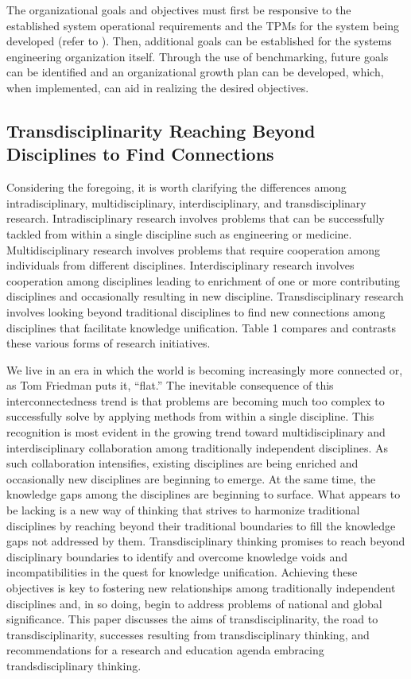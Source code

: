 The organizational goals and objectives must first be responsive to the established system operational requirements and the TPMs for the system being developed (refer to ). Then, additional goals can be established for the systems engineering organization itself. Through the use of benchmarking, future goals can be identified and an organizational growth plan can be developed, which, when implemented, can aid in realizing the desired objectives.

\subsection{Transdisciplinarity Reaching Beyond Disciplines to Find Connections}

Considering the foregoing, it is worth clarifying the differences among intradisciplinary, multidisciplinary, interdisciplinary, and transdisciplinary research. Intradisciplinary research involves problems that can be successfully tackled from within a single discipline such as engineering or medicine. Multidisciplinary research involves problems that require cooperation among individuals from different disciplines. Interdisciplinary research involves cooperation among disciplines leading to enrichment of one or more contributing disciplines and occasionally resulting in new discipline. Transdisciplinary research involves looking beyond traditional disciplines to find new connections among disciplines that facilitate knowledge unification. Table 1 compares and contrasts these various forms of research initiatives. 

We live in an era in which the world is becoming increasingly more connected or, as Tom Friedman puts it, ``flat.'' The inevitable consequence of this interconnectedness trend is that problems are becoming much too complex to successfully solve by applying methods from within a single discipline. This recognition is most evident in the growing trend toward multidisciplinary and interdisciplinary collaboration among traditionally independent disciplines. As such collaboration intensifies, existing disciplines are being enriched and occasionally new disciplines are beginning to emerge. At the same time, the knowledge gaps among the disciplines are beginning to surface. What appears to be lacking is a new way of thinking that strives to harmonize traditional disciplines by reaching beyond their traditional boundaries to fill the knowledge gaps not addressed by them. Transdisciplinary thinking promises to reach beyond disciplinary boundaries to identify and overcome knowledge voids and incompatibilities in the quest for knowledge unification. Achieving these objectives is key to fostering new relationships among traditionally independent disciplines and, in so doing, begin to address problems of national and global significance. This paper discusses the aims of transdisciplinarity, the road to transdisciplinarity, successes resulting from transdisciplinary thinking, and recommendations for a research and education agenda embracing trandsdisciplinary thinking. 

